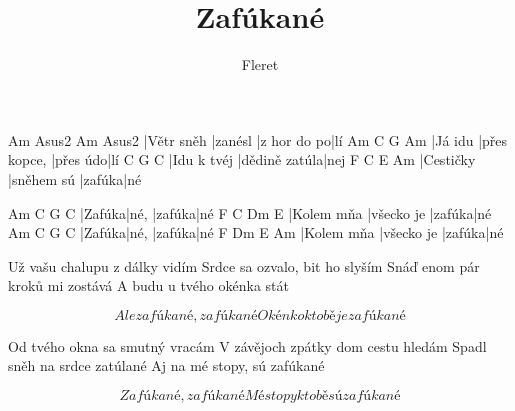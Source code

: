 \documentclass{song}
\title{Zafúkané}
\author{Fleret}
\begin{document}
\strophe
Am         Asus2   Am          Asus2
|Větr sněh |zanésl |z hor do po|lí
Am      C            G        Am
|Já idu |přes kopce, |přes údo|lí
C           G             C
|Idu k tvéj |dědině zatúla|nej
F         C          E      Am
|Cestičky |sněhem sú |zafúka|né
\endstrophe


Am     C    G      C
|Zafúka|né, |zafúka|né
F          C          Dm     E
|Kolem mňa |všecko je |zafúka|né
Am     C    G      C
|Zafúka|né, |zafúka|né
F          Dm         E      Am
|Kolem mňa |všecko je |zafúka|né
\endstrophe


\strophe*
Už vašu chalupu z dálky vidím
Srdce sa ozvalo, bit ho slyším
Snáď enom pár kroků mi zostává
A budu u tvého okénka stát
\endstrophe

\[ Ale zafúkané, zafúkané
Okénko k tobě je zafúkané \]
\endstrophe

\strophe*
Od tvého okna sa smutný vracám
V závějoch zpátky dom cestu hledám
Spadl sněh na srdce zatúlané
Aj na mé stopy, sú zafúkané
\endstrophe

\[ Zafúkané, zafúkané
Mé stopy k tobě sú zafúkané \]
\endstrophe

\end{document}
